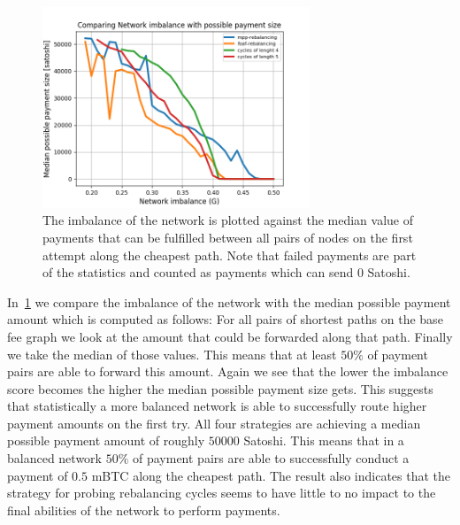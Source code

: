 \documentclass[conference]{IEEEtran}
\begin{document}
\begin{figure}
 \centering
 \includegraphics[width=8cm]{code/vs/fig/imba_vs_median_payment_size.png}
 \caption{The imbalance of the network is plotted against the median value of payments that can be fulfilled between all pairs of nodes on the first attempt along the cheapest path. Note that failed payments are part of the statistics and counted as payments which can send $0$ Satoshi.}
 \label{fig:imba_vs_payment_size}
\end{figure}

In~\cref{fig:imba_vs_payment_size} we compare the imbalance of the network with the median possible payment amount which is computed as follows:
For all pairs of shortest paths on the base fee graph we look at the amount that could be forwarded along that path.
Finally we take the median of those values.
This means that at least $50\%$ of payment pairs are able to forward this amount.
Again we see that the lower the imbalance score becomes the higher the median possible payment size gets.
This suggests that statistically a more balanced network is able to successfully route higher payment amounts on the first try.
All four strategies are achieving a median possible payment amount of roughly $50000$ Satoshi.
This means that in a balanced network $50\%$ of payment pairs are able to successfully conduct a payment of $0.5$ mBTC along the cheapest path. 
The result also indicates that the strategy for probing rebalancing cycles seems to have little to no impact to the final abilities of the network to perform payments.


\end{document}
